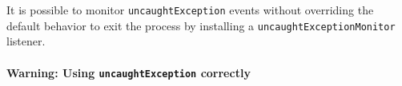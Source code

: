 \begin{Shaded}
\begin{Highlighting}[]
  \OperatorTok{=} \NormalTok{(}\NormalTok{)}\OperatorTok{;}

\NormalTok{(}\OperatorTok{,}\OperatorTok{,}\KeywordTok{=\textgreater{}}\NormalTok{ \{}
\NormalTok{(}
    \OperatorTok{,}
    \SpecialCharTok{$\{}\VerbatimStringTok{\textasciigrave{}} \OperatorTok{+}
    \SpecialCharTok{$\{}\SpecialCharTok{\}}\VerbatimStringTok{\textasciigrave{}}\OperatorTok{,}
\NormalTok{  )}\OperatorTok{;}
\NormalTok{\})}\OperatorTok{;}

\NormalTok{(() }\KeywordTok{=\textgreater{}}\NormalTok{ \{}
  \NormalTok{(}\NormalTok{)}\OperatorTok{;}
\NormalTok{\}}\OperatorTok{,} \NormalTok{)}\OperatorTok{;}

\NormalTok{()}\OperatorTok{;}
\NormalTok{(}\NormalTok{)}\OperatorTok{;}
\end{Highlighting}
\end{Shaded}

It is possible to monitor
\texttt{\textquotesingle{}uncaughtException\textquotesingle{}} events
without overriding the default behavior to exit the process by
installing a
\texttt{\textquotesingle{}uncaughtExceptionMonitor\textquotesingle{}}
listener.

\paragraph{\texorpdfstring{Warning: Using
\texttt{\textquotesingle{}uncaughtException\textquotesingle{}}
correctly}{Warning: Using \textquotesingle uncaughtException\textquotesingle{} correctly}}\label{warning-using-uncaughtexception-correctly}

